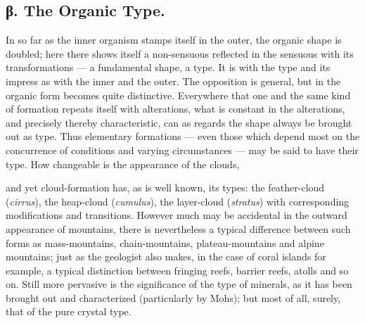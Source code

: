 \documentclass[12pt,a4paper]{book}
\begin{document}
\subsection*{β. The Organic Type.}

In so far as the inner organism stamps itself in the outer, the organic shape
is doubled; here there shows itself a non-sensuous reflected in the sensuous
with its transformations --- a fundamental shape, a type. It is with the type
and its impress as with the inner and the outer. The opposition is general, but
in the organic form becomes quite distinctive. Everywhere that one and the same
kind of formation repeats itself with alterations, what is constant in the
alterations, and precisely thereby characteristic, can as regards the shape
always be brought out as type. Thus elementary formations --- even those which
depend most on the concurrence of conditions and varying circumstances --- may
be said to have their type. How changeable is the appearance of the clouds,

and yet cloud-formation has, as is well known, its types: the feather-cloud
(\textit{cirrus}), the heap-cloud (\textit{cumulus}), the layer-cloud
(\textit{stratus}) with corresponding modifications and transitions.
However much may be accidental in the outward appearance of mountains, there is
nevertheless a typical difference between such forms as mass-mountains,
chain-mountains, plateau-mountains and alpine mountains; just as the geologist
also makes, in the case of coral islands for example, a typical distinction
between fringing reefs, barrier reefs, atolls and so on. Still more pervasive
is the significance of the type of minerals, as it has been brought out and
characterized (particularly by Mohs); but most of all, surely, that of the pure
crystal type.
\end{document}
